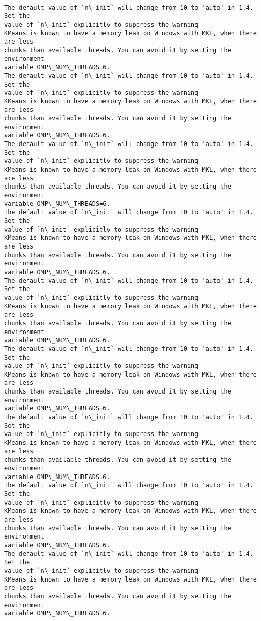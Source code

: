 \documentclass[11pt]{article}
\begin{document}
    \begin{center}
    \end{center}
    { \hspace*{\fill} \\}
    
    \begin{Verbatim}[commandchars=\\\{\}]
The default value of `n\_init` will change from 10 to 'auto' in 1.4. Set the
value of `n\_init` explicitly to suppress the warning
KMeans is known to have a memory leak on Windows with MKL, when there are less
chunks than available threads. You can avoid it by setting the environment
variable OMP\_NUM\_THREADS=6.
The default value of `n\_init` will change from 10 to 'auto' in 1.4. Set the
value of `n\_init` explicitly to suppress the warning
KMeans is known to have a memory leak on Windows with MKL, when there are less
chunks than available threads. You can avoid it by setting the environment
variable OMP\_NUM\_THREADS=6.
The default value of `n\_init` will change from 10 to 'auto' in 1.4. Set the
value of `n\_init` explicitly to suppress the warning
KMeans is known to have a memory leak on Windows with MKL, when there are less
chunks than available threads. You can avoid it by setting the environment
variable OMP\_NUM\_THREADS=6.
The default value of `n\_init` will change from 10 to 'auto' in 1.4. Set the
value of `n\_init` explicitly to suppress the warning
KMeans is known to have a memory leak on Windows with MKL, when there are less
chunks than available threads. You can avoid it by setting the environment
variable OMP\_NUM\_THREADS=6.
The default value of `n\_init` will change from 10 to 'auto' in 1.4. Set the
value of `n\_init` explicitly to suppress the warning
KMeans is known to have a memory leak on Windows with MKL, when there are less
chunks than available threads. You can avoid it by setting the environment
variable OMP\_NUM\_THREADS=6.
The default value of `n\_init` will change from 10 to 'auto' in 1.4. Set the
value of `n\_init` explicitly to suppress the warning
KMeans is known to have a memory leak on Windows with MKL, when there are less
chunks than available threads. You can avoid it by setting the environment
variable OMP\_NUM\_THREADS=6.
The default value of `n\_init` will change from 10 to 'auto' in 1.4. Set the
value of `n\_init` explicitly to suppress the warning
KMeans is known to have a memory leak on Windows with MKL, when there are less
chunks than available threads. You can avoid it by setting the environment
variable OMP\_NUM\_THREADS=6.
The default value of `n\_init` will change from 10 to 'auto' in 1.4. Set the
value of `n\_init` explicitly to suppress the warning
KMeans is known to have a memory leak on Windows with MKL, when there are less
chunks than available threads. You can avoid it by setting the environment
variable OMP\_NUM\_THREADS=6.
The default value of `n\_init` will change from 10 to 'auto' in 1.4. Set the
value of `n\_init` explicitly to suppress the warning
KMeans is known to have a memory leak on Windows with MKL, when there are less
chunks than available threads. You can avoid it by setting the environment
variable OMP\_NUM\_THREADS=6.
    \end{Verbatim}
\end{document}
